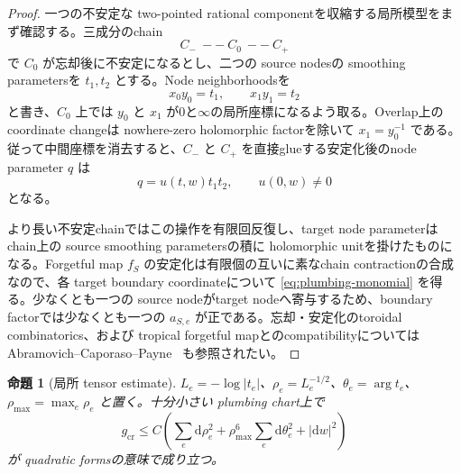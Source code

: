 \documentclass[11pt,a4paper]{ltjsarticle}
\newcommand{\dd}{\mathrm d}
\theoremstyle{plain}
\newtheorem{proposition}[proposition]{命題}
\theoremstyle{definition}
\theoremstyle{remark}
\begin{document}
\begin{proof}
一つの不安定な two-pointed rational componentを収縮する局所模型をまず確認する。三成分のchain
\[
 C_-\ --\ C_0\ --\ C_+
\]
で $C_0$ が忘却後に不安定になるとし、二つの source nodesの smoothing parametersを $t_1,t_2$ とする。Node neighborhoodsを
\[
 x_0y_0=t_1,\qquad x_1y_1=t_2
\]
と書き、$C_0$ 上では $y_0$ と $x_1$ が0と$\infty$の局所座標になるよう取る。Overlap上の coordinate changeは nowhere-zero holomorphic factorを除いて $x_1=y_0^{-1}$ である。従って中間座標を消去すると、$C_-$ と $C_+$ を直接glueする安定化後のnode parameter $q$ は
\[
 q=u(t,w)t_1t_2,
\qquad u(0,w)\ne0
\]
となる。

より長い不安定chainではこの操作を有限回反復し、target node parameterはchain上の source smoothing parametersの積に holomorphic unitを掛けたものになる。Forgetful map $f_S$ の安定化は有限個の互いに素なchain contractionの合成なので、各 target boundary coordinateについて \eqref{eq:plumbing-monomial} を得る。少なくとも一つの source nodeがtarget nodeへ寄与するため、boundary factorでは少なくとも一つの $a_{S,e}$ が正である。忘却・安定化のtoroidal combinatorics、および tropical forgetful mapとのcompatibilityについては Abramovich--Caporaso--Payne~\cite{ACP} も参照されたい。
\end{proof}

\begin{proposition}[局所 tensor estimate]
\label{prop:local-wp-estimate}
$L_e=-\log|t_e|$、$\rho_e=L_e^{-1/2}$、$\theta_e=\arg t_e$、$\rho_{\max}=\max_e\rho_e$ と置く。十分小さい plumbing chart上で
\begin{equation}
\label{eq:local-wp-estimate}
 g_{\mathrm{cr}}
 \le C\left(
   \sum_e\dd\rho_e^2
   +\rho_{\max}^6\sum_e\dd\theta_e^2
   +|\dd w|^2
 \right)
\end{equation}
が quadratic formsの意味で成り立つ。
\end{proposition}
\end{document}
